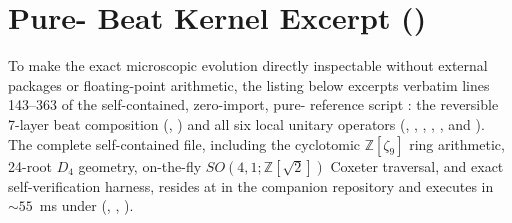 \section{Pure- Beat Kernel Excerpt ()}
\label{sec:refcode}

To make the exact microscopic evolution directly inspectable without external packages or floating-point arithmetic,
the listing below excerpts verbatim lines 143--363 of the self-contained, zero-import, pure- reference
script  \cite{cluesurf2026repo}: the reversible 7-layer beat composition (,
) and all six local unitary operators (, ,
, , , and ). The
complete self-contained file, including the cyclotomic $\mathbb{Z}[\zeta_9]$ ring arithmetic, 24-root $D_4$ geometry,
on-the-fly $SO(4,1; \mathbb{Z}[\sqrt{2}])$ Coxeter traversal, and exact self-verification harness, resides at
 in the companion repository and executes in $\sim 55$~ms under 
(, , ).

